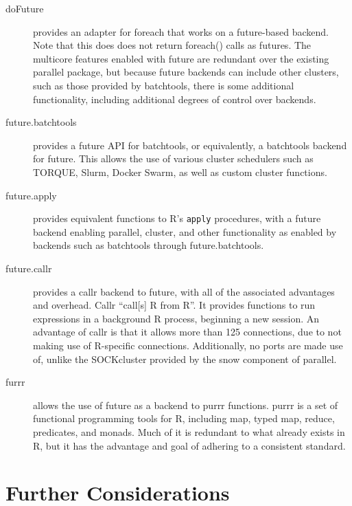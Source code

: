 \documentclass[10pt,a4paper]{article}
\begin{document}
\begin{description}
	\item[doFuture]\cite{bengtsson20do} provides an adapter for
	      foreach\cite{microsoft20} that works on a future-based backend. Note
	      that this does does not return foreach() calls as futures. The
	      multicore features enabled with future are redundant over the
	      existing parallel package, but because future backends can include
	      other clusters, such as those provided by batchtools, there is some
	      additional functionality, including additional degrees of control
	      over backends.
	\item[future.batchtools]\cite{bengtsson19batch} provides a future API
	      for batchtools\cite{lang17}, or equivalently, a batchtools backend
	      for future. This allows the use of various cluster schedulers such
	      as TORQUE, Slurm, Docker Swarm, as well as custom cluster functions.
	\item[future.apply]\cite{bengtsson20apply} provides equivalent
	      functions to R's \texttt{apply} procedures, with a future backend
	      enabling parallel, cluster, and other functionality as enabled by
	      backends such as batchtools through future.batchtools.
	\item[future.callr]\cite{bengtsson19callr} provides a
	      callr\cite{csardi20} backend to future, with all of the associated
	      advantages and overhead. Callr \enquote{call[s] R from R}. It
	      provides functions to run expressions in a background R process,
	      beginning a new session. An advantage of callr is that it allows
	      more than 125 connections, due to not making use of R-specific
	      connections. Additionally, no ports are made use of, unlike the
	      SOCKcluster provided by the snow component of parallel.
	\item[furrr]\cite{vaughan18} allows the use of future as a backend to
	      purrr functions. purrr is a set of functional programming tools for
	      R, including map, typed map, reduce, predicates, and monads. Much of
	      it is redundant to what already exists in R, but it has the
	      advantage and goal of adhering to a consistent standard.
\end{description}

\section{Further Considerations}
\label{sec:further-considerations}
\end{document}
